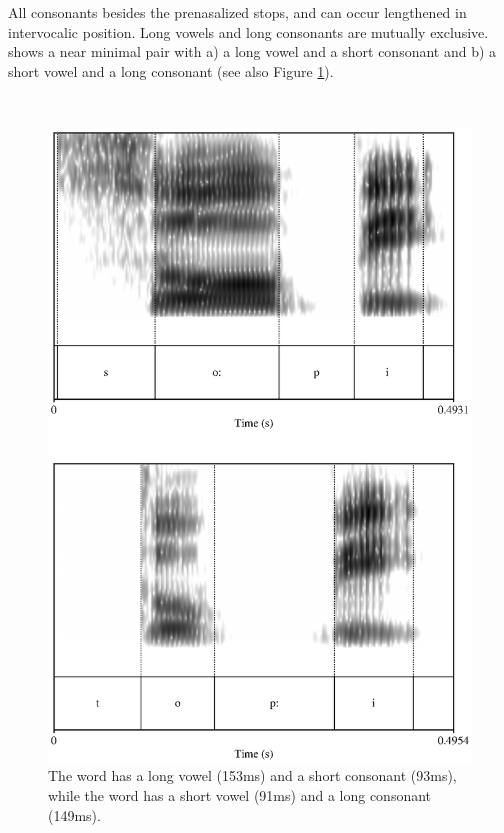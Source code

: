 All consonants besides the prenasalized stops, \dentd{} and \V{} can occur lengthened in intervocalic position. Long vowels and long consonants are mutually exclusive.  shows a near minimal pair with a) a long vowel and a short consonant and b) a short vowel and a long consonant (see also Figure \ref{fig:soopithoppi}).

 \\

\begin{figure}
 \centering
 \includegraphics{pics/soopithoppi.eps}
 \caption[Vowel and consonant length in  and ]{The word  has a long vowel (153ms) and a short consonant (93ms), while the word  has a short vowel (91ms) and a long consonant (149ms).}
 \label{fig:soopithoppi}
\end{figure}





